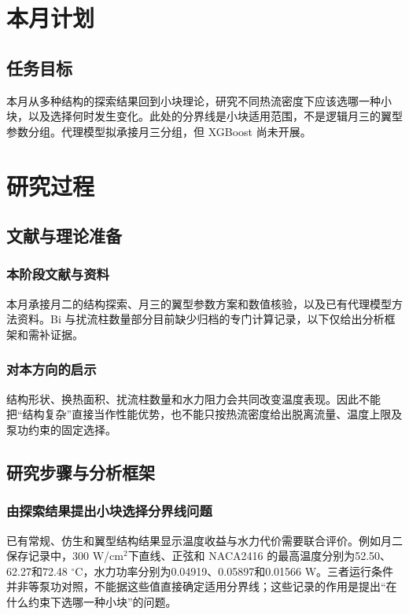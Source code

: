 \documentclass[stage2,fontset=fandol]{ydzjreport}
\begin{document}
\makestagetwohead

\section{本月计划}

\subsection{任务目标}

本月从多种结构的探索结果回到小块理论，研究不同热流密度下应该选哪一种小块，以及选择何时发生变化。此处的分界线是小块适用范围，不是逻辑月三的翼型参数分组。代理模型拟承接月三分组，但 XGBoost 尚未开展。

\section{研究过程}

\subsection{文献与理论准备}

\subsubsection{本阶段文献与资料}

本月承接月二的结构探索、月三的翼型参数方案和数值核验，以及已有代理模型方法资料。Bi 与扰流柱数量部分目前缺少归档的专门计算记录，以下仅给出分析框架和需补证据。

\subsubsection{对本方向的启示}

结构形状、换热面积、扰流柱数量和水力阻力会共同改变温度表现。因此不能把“结构复杂”直接当作性能优势，也不能只按热流密度给出脱离流量、温度上限及泵功约束的固定选择。



\subsection{研究步骤与分析框架}

\subsubsection{由探索结果提出小块选择分界线问题}
已有常规、仿生和翼型结构结果显示温度收益与水力代价需要联合评价。例如月二保存记录中，300 W/cm$^2$下直线、正弦和 NACA2416 的最高温度分别为52.50、62.27和72.48 $^\circ$C，水力功率分别为0.04919、0.05897和0.01566 W。三者运行条件并非等泵功对照，不能据这些值直接确定适用分界线；这些记录的作用是提出“在什么约束下选哪一种小块”的问题。
\end{document}
